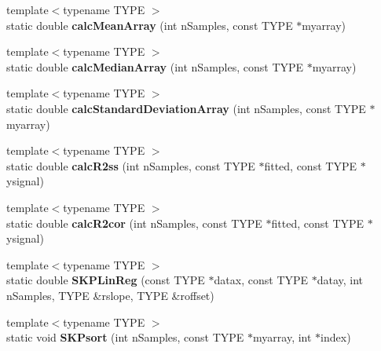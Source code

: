 \begin{DoxyCompactItemize}
\item 
\hypertarget{class_k_w_util_ad9cb19db7d541d5ca5a60c6a28b922e1}{{\footnotesize template$<$typename T\-Y\-P\-E $>$ }\\static double {\bfseries calc\-Mean\-Array} (int n\-Samples, const T\-Y\-P\-E $\ast$myarray)}\label{class_k_w_util_ad9cb19db7d541d5ca5a60c6a28b922e1}

\item 
\hypertarget{class_k_w_util_a6c10285ae2d87ccda6ddaa18c81dea39}{{\footnotesize template$<$typename T\-Y\-P\-E $>$ }\\static double {\bfseries calc\-Median\-Array} (int n\-Samples, const T\-Y\-P\-E $\ast$myarray)}\label{class_k_w_util_a6c10285ae2d87ccda6ddaa18c81dea39}

\item 
\hypertarget{class_k_w_util_ad9d38c641f6b227be4418acf404170d4}{{\footnotesize template$<$typename T\-Y\-P\-E $>$ }\\static double {\bfseries calc\-Standard\-Deviation\-Array} (int n\-Samples, const T\-Y\-P\-E $\ast$myarray)}\label{class_k_w_util_ad9d38c641f6b227be4418acf404170d4}

\item 
\hypertarget{class_k_w_util_ae26dd38b1c5c823fa37129520bb4cc47}{{\footnotesize template$<$typename T\-Y\-P\-E $>$ }\\static double {\bfseries calc\-R2ss} (int n\-Samples, const T\-Y\-P\-E $\ast$fitted, const T\-Y\-P\-E $\ast$ysignal)}\label{class_k_w_util_ae26dd38b1c5c823fa37129520bb4cc47}

\item 
\hypertarget{class_k_w_util_a9eecfdafa3ae5e493830181fa7ea8fa3}{{\footnotesize template$<$typename T\-Y\-P\-E $>$ }\\static double {\bfseries calc\-R2cor} (int n\-Samples, const T\-Y\-P\-E $\ast$fitted, const T\-Y\-P\-E $\ast$ysignal)}\label{class_k_w_util_a9eecfdafa3ae5e493830181fa7ea8fa3}

\item 
\hypertarget{class_k_w_util_ac7633e5346a8b4ad6b2d1d960eb22fc9}{{\footnotesize template$<$typename T\-Y\-P\-E $>$ }\\static double {\bfseries S\-K\-P\-Lin\-Reg} (const T\-Y\-P\-E $\ast$datax, const T\-Y\-P\-E $\ast$datay, int n\-Samples, T\-Y\-P\-E \&rslope, T\-Y\-P\-E \&roffset)}\label{class_k_w_util_ac7633e5346a8b4ad6b2d1d960eb22fc9}

\item 
\hypertarget{class_k_w_util_adea3028ddaac44e13ab60460b0e50452}{{\footnotesize template$<$typename T\-Y\-P\-E $>$ }\\static void {\bfseries S\-K\-Psort} (int n\-Samples, const T\-Y\-P\-E $\ast$myarray, int $\ast$index)}\label{class_k_w_util_adea3028ddaac44e13ab60460b0e50452}


\end{DoxyCompactItemize}
